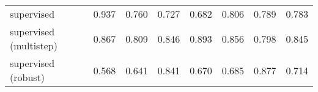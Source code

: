 {\begin{tabular}{lrrrrrrr}
supervised                   &       0.937 &                0.760 &        0.727 &            0.682 &          0.806 &                       0.789 &        0.783 \\
supervised (multistep)       &       0.867 &                0.809 &        0.846 &            0.893 &          0.856 &                       0.798 &        0.845 \\
supervised (robust)          &       0.568 &                0.641 &        0.841 &            0.670 &          0.685 &                       0.877 &        0.714 \\
\bottomrule
\end{tabular}
}
